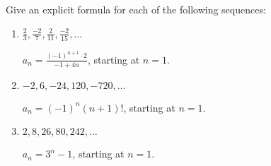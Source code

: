 \documentclass[]{ximera}
\begin{document}
\begin{problem}
Give an explicit formula for each of the following sequences:
	\begin{enumerate}
	\item 	$\frac{2}{3}, \frac{-2}{7}, \frac{2}{11}, \frac{-2}{15}, \hdots$
	\begin{freeResponse}
	$a_n = \frac{(-1)^{n+1} \cdot 2}{-1 + 4n}$, starting at $n=1$.
	\end{freeResponse}
	
	
	
	\item 	$-2, 6,-24,120,-720, \hdots$
	\begin{freeResponse}
	$a_n = (-1)^n (n+1)!$, starting at $n=1$.
	\end{freeResponse}
	
	
	
	\item 	$2,8,26,80,242,\hdots$
	\begin{freeResponse}
	$a_n = 3^n - 1$, starting at $n=1$.
	\end{freeResponse}
	\end{enumerate}
		
\end{problem}

\begin{instructorNotes}

\end{instructorNotes}
\end{document}
